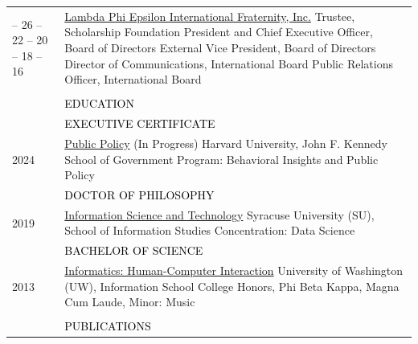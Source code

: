 \documentclass[12pt]{article}
\begin{document}
{\begin{longtable}{R{0.75in}p{5.0in}}
\footnotesize{\vspace{0mm}  -- 26\vspace{1mm}  -- 22\vspace{1mm}  -- 20 \vspace{1mm}  -- 18 \vspace{1mm}  -- 16 \hfill} & \href{https://lambdaphiepsilon.org/message-from-president-20/}{Lambda Phi Epsilon International Fraternity, Inc.} \break Trustee, Scholarship Foundation \break President and Chief Executive Officer, Board of Directors \break External Vice President, Board of Directors \break Director of Communications, International Board \break Public Relations Officer, International Board  \medskip\\\\

\sout{\hfill} 
& \par \Large \textcolor{black}{\uppercase{Education\hspace{6pt} \sout{\hfill}}} \medskip \\

& \large \textcolor{black}{\uppercase{Executive Certificate}}\\
\footnotesize{2024} & \href{https://www.hks.harvard.edu/}{Public Policy} (In Progress)
\break Harvard University, John F. Kennedy School of Government \break Program: Behavioral Insights and Public Policy\medskip \\ 

& \large \textcolor{black}{\uppercase{Doctor of Philosophy}}\\
\footnotesize{2019} & \href{https://web.archive.org/web/20200311064951/https://ischool.syr.edu/people/directories/view/bdosono/}{Information Science and Technology}
\break Syracuse University (SU), School of Information Studies \break Concentration: Data Science \medskip \\ 

& \large \textcolor{black}{\uppercase{Bachelor of Science}}\\
\footnotesize{2013} & \href{https://web.archive.org/web/20170203233921/http://ischool.uw.edu/research/student-research/dosono}{{Informatics: Human-Computer Interaction}} \break University of Washington (UW), Information School \break College Honors, Phi Beta Kappa, Magna Cum Laude, Minor: Music\\\\

\sout{\hfill} 
& \par \Large \textcolor{black}{\uppercase{Publications\hspace{6pt} \sout{\hfill}}} \medskip \\


\end{longtable}}
\end{document}
